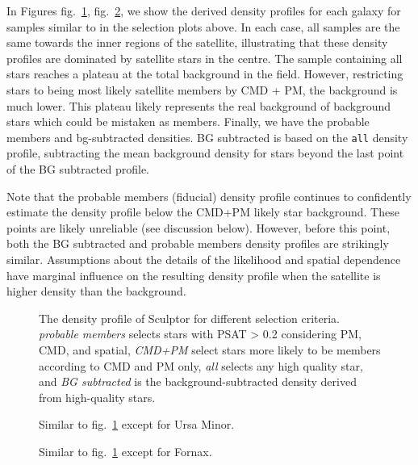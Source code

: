 In Figures fig.~\ref{fig:scl_observed_profiles},
fig.~\ref{fig:umi_observed_profiles}, we show the derived density
profiles for each galaxy for samples similar to in the selection plots
above. In each case, all samples are the same towards the inner regions
of the satellite, illustrating that these density profiles are dominated
by satellite stars in the centre. The sample containing all stars
reaches a plateau at the total background in the field. However,
restricting stars to being most likely satellite members by CMD + PM,
the background is much lower. This plateau likely represents the real
background of background stars which could be mistaken as members.
Finally, we have the probable members and bg-subtracted densities. BG
subtracted is based on the \texttt{all} density profile, subtracting the
mean background density for stars beyond the last point of the BG
subtracted profile.

Note that the probable members (fiducial) density profile continues to
confidently estimate the density profile below the CMD+PM likely star
background. These points are likely unreliable (see discussion below).
However, before this point, both the BG subtracted and probable members
density profiles are strikingly similar. Assumptions about the details
of the likelihood and spatial dependence have marginal influence on the
resulting density profile when the satellite is higher density than the
background.

\begin{figure}
\centering
{}
\caption[Sculptor density profiles]{The density profile of Sculptor for
different selection criteria. \emph{probable members} selects stars with
PSAT \textgreater{} 0.2 considering PM, CMD, and spatial, \emph{CMD+PM}
select stars more likely to be members according to CMD and PM only,
\emph{all} selects any high quality star, and \emph{BG subtracted} is
the background-subtracted density derived from high-quality
stars.}\label{fig:scl_observed_profiles}
\end{figure}

\begin{figure}
\centering
{}
\caption[Ursa Minor density profiles]{Similar to
fig.~\ref{fig:scl_observed_profiles} except for Ursa
Minor.}\label{fig:umi_observed_profiles}
\end{figure}

\begin{figure}
\centering
{}
\caption[Fornax density profiles]{Similar to
fig.~\ref{fig:scl_observed_profiles} except for
Fornax.}\label{fig:fornax_observed_profiles}
\end{figure}

